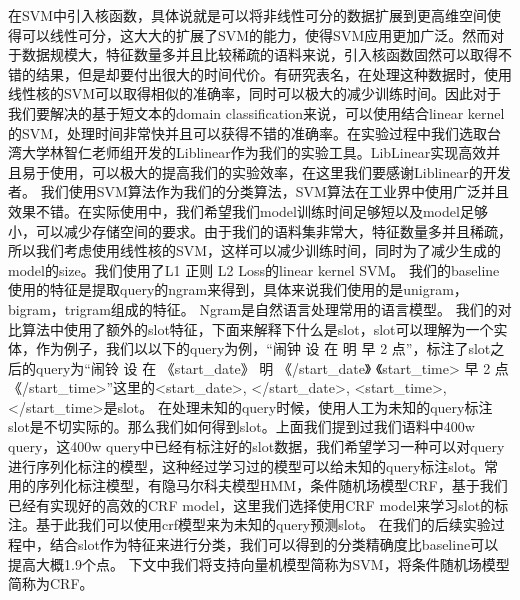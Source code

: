 \documentclass[master]{njuthesis}
\begin{document}
    在SVM中引入核函数，具体说就是可以将非线性可分的数据扩展到更高维空间使得可以线性可分，这大大的扩展了SVM的能力，使得SVM应用更加广泛。然而对于数据规模大，特征数量多并且比较稀疏的语料来说，引入核函数固然可以取得不错的结果，但是却要付出很大的时间代价。有研究表名，在处理这种数据时，使用线性核的SVM可以取得相似的准确率，同时可以极大的减少训练时间。因此对于我们要解决的基于短文本的domain classification来说，可以使用结合linear kernel的SVM，处理时间非常快并且可以获得不错的准确率。在实验过程中我们选取台湾大学林智仁老师组开发的Liblinear作为我们的实验工具。LibLinear实现高效并且易于使用，可以极大的提高我们的实验效率，在这里我们要感谢Liblinear的开发者。
我们使用SVM算法作为我们的分类算法，SVM算法在工业界中使用广泛并且效果不错。在实际使用中，我们希望我们model训练时间足够短以及model足够小，可以减少存储空间的要求。由于我们的语料集非常大，特征数量多并且稀疏，所以我们考虑使用线性核的SVM，这样可以减少训练时间，同时为了减少生成的model的size。我们使用了L1 正则 L2 Loss的linear kernel SVM。
我们的baseline使用的特征是提取query的ngram来得到，具体来说我们使用的是unigram，bigram，trigram组成的特征。
Ngram是自然语言处理常用的语言模型。
我们的对比算法中使用了额外的slot特征，下面来解释下什么是slot，slot可以理解为一个实体，作为例子，我们以以下的query为例，“闹钟 设 在 明 早 2 点”，标注了slot之后的query为“闹铃 设 在 《start\_date》 明 《/start\_date》 《start\_time>  早 2 点 《/start\_time>”这里的<start\_date>, </start\_date>, <start\_time>, </start\_time>是slot。
在处理未知的query时候，使用人工为未知的query标注slot是不切实际的。那么我们如何得到slot。上面我们提到过我们语料中400w query，这400w query中已经有标注好的slot数据，我们希望学习一种可以对query进行序列化标注的模型，这种经过学习过的模型可以给未知的query标注slot。常用的序列化标注模型，有隐马尔科夫模型HMM，条件随机场模型CRF，基于我们已经有实现好的高效的CRF model，这里我们选择使用CRF model来学习slot的标注。基于此我们可以使用crf模型来为未知的query预测slot。
在我们的后续实验过程中，结合slot作为特征来进行分类，我们可以得到的分类精确度比baseline可以提高大概1.9个点。
下文中我们将支持向量机模型简称为SVM，将条件随机场模型简称为CRF。
\end{document}
